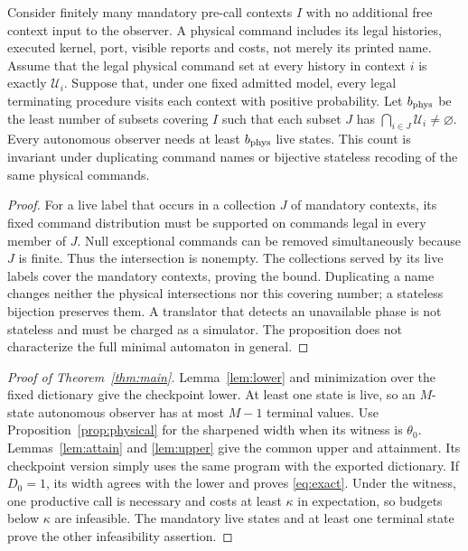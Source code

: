 \begin{proposition}\label{prop:physical}
Consider finitely many mandatory pre-call contexts $I$ with no additional free context input to the observer. A physical command includes its legal histories, executed kernel, port, visible reports and costs, not merely its printed name. Assume that the legal physical command set at every history in context $i$ is exactly $\mathcal U_i$. Suppose that, under one fixed admitted model, every legal terminating procedure visits each context with positive probability. Let $b_{\rm phys}$ be the least number of subsets covering $I$ such that each subset $J$ has $\bigcap_{i\in J}\mathcal U_i\ne\varnothing$. Every autonomous observer needs at least $b_{\rm phys}$ live states. This count is invariant under duplicating command names or bijective stateless recoding of the same physical commands.
\end{proposition}
\begin{proof}
For a live label that occurs in a collection $J$ of mandatory contexts, its fixed command distribution must be supported on commands legal in every member of $J$. Null exceptional commands can be removed simultaneously because $J$ is finite. Thus the intersection is nonempty. The collections served by its live labels cover the mandatory contexts, proving the bound. Duplicating a name changes neither the physical intersections nor this covering number; a stateless bijection preserves them. A translator that detects an unavailable phase is not stateless and must be charged as a simulator. The proposition does not characterize the full minimal automaton in general.
\end{proof}

\begin{proof}[Proof of Theorem~\ref{thm:main}]
Lemma~\ref{lem:lower} and minimization over the fixed dictionary give the checkpoint lower. At least one state is live, so an $M$-state autonomous observer has at most $M-1$ terminal values. Use Proposition~\ref{prop:physical} for the sharpened width when its witness is $\theta_0$. Lemmas~\ref{lem:attain} and \ref{lem:upper} give the common upper and attainment. Its checkpoint version simply uses the same program with the exported dictionary. If $D_0=1$, its width agrees with the lower and proves \eqref{eq:exact}. Under the witness, one productive call is necessary and costs at least $\kappa$ in expectation, so budgets below $\kappa$ are infeasible. The mandatory live states and at least one terminal state prove the other infeasibility assertion.
\end{proof}
